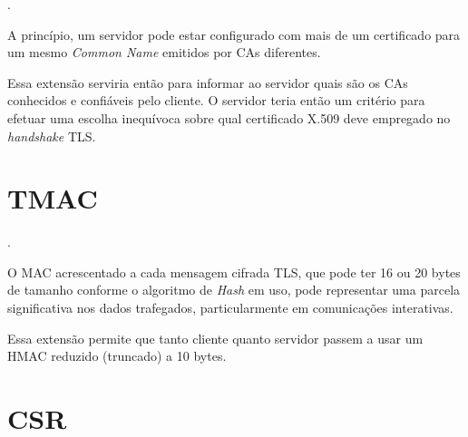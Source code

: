 \begin{description}[\breaklabel]

\item[Referência]
	.

\item[Sinopse]
	A princípio, um servidor pode estar configurado com mais de um certificado 
	para um mesmo \emph{Common Name} emitidos por \acsp{CA} diferentes.
	
\item[Propósito da Extensão]
	Essa extensão serviria então para informar ao servidor quais são os \acsp{CA} conhecidos e 
	confiáveis pelo cliente. O servidor teria então um critério para efetuar uma escolha 
	inequívoca sobre qual certificado X.509 deve empregado no \emph{handshake} TLS.

\end{description}


\section{\acf{TMAC}}

\begin{description}[\breaklabel]

\item[Referência]
	.

\item[Sinopse]
	O MAC acrescentado a cada mensagem cifrada TLS, que pode ter 16 ou 20 bytes de tamanho
	conforme o algoritmo de \emph{Hash} em uso, pode representar uma parcela significativa
	nos dados trafegados, particularmente em comunicações interativas.

\item[Propósito da Extensão]
	Essa extensão permite que tanto cliente quanto servidor passem a usar um \acs{HMAC} reduzido 
	(truncado) a 10 bytes.

\end{description}


\section{\acf{CSR}}

